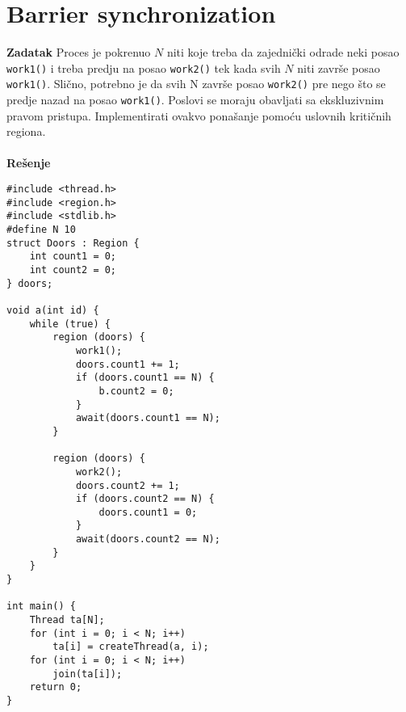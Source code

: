 \clearpage
\section{Barrier synchronization}
\textbf{\large Zadatak} Proces je pokrenuo $N$ niti koje treba da zajedni\v{c}ki odrade neki posao \texttt{work1()} i treba predju na posao \texttt{work2()} tek kada svih $N$ niti zavr\v{s}e posao \texttt{work1()}. Sli\v{c}no, potrebno je da svih $\mathrm N$ zavr\v{s}e posao \texttt{work2()} pre nego \v{s}to se predje nazad na posao \texttt{work1()}. Poslovi se moraju obavljati sa ekskluzivnim pravom pristupa. Implementirati ovakvo pona\v{s}anje pomo\'{c}u uslovnih kriti\v{c}nih regiona.
\\\\
\textbf{\large Re\v{s}enje}
\begin{lstlisting}
#include <thread.h>
#include <region.h>
#include <stdlib.h>
#define N 10
struct Doors : Region {
    int count1 = 0;
    int count2 = 0;
} doors;

void a(int id) {
    while (true) {
        region (doors) {
			work1();
            doors.count1 += 1;
            if (doors.count1 == N) {
                b.count2 = 0;
            }
            await(doors.count1 == N);
        }

        region (doors) {
			work2();
            doors.count2 += 1;
            if (doors.count2 == N) {
                doors.count1 = 0;
            }
            await(doors.count2 == N);
        }
    }
}

int main() {
    Thread ta[N];
    for (int i = 0; i < N; i++) 
        ta[i] = createThread(a, i);
    for (int i = 0; i < N; i++) 
        join(ta[i]);
    return 0;
}

\end{lstlisting}
